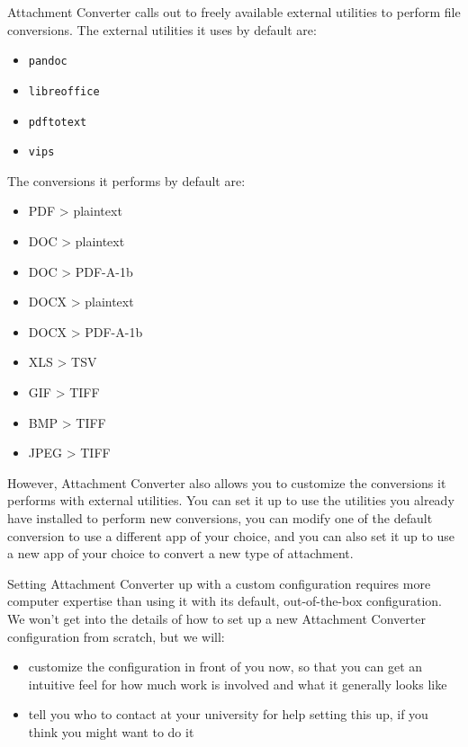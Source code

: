 \documentclass[11pt]{article}
\begin{document}
Attachment Converter calls out to freely available external utilities
to perform file conversions.  The external utilities it uses by
default are:

\begin{itemize}
\item \texttt{pandoc}
\item \texttt{libreoffice}
\item \texttt{pdftotext}
\item \texttt{vips}
\end{itemize}

The conversions it performs by default are:

\begin{itemize}
\item PDF > plaintext
\item DOC > plaintext
\item DOC > PDF-A-1b
\item DOCX > plaintext
\item DOCX > PDF-A-1b
\item XLS > TSV
\item GIF > TIFF
\item BMP > TIFF
\item JPEG > TIFF
\end{itemize}

However, Attachment Converter also allows you to customize the
conversions it performs with external utilities.  You can set it up to
use the utilities you already have installed to perform new
conversions, you can modify one of the default conversion to use a
different app of your choice, and you can also set it up to use a new
app of your choice to convert a new type of attachment.

Setting Attachment Converter up with a custom configuration requires
more computer expertise than using it with its default, out-of-the-box
configuration.  We won't get into the details of how to set up a new
Attachment Converter configuration from scratch, but we will:

\begin{itemize}
\item customize the configuration in front of you now, so that you can get
an intuitive feel for how much work is involved and what it
generally looks like
\item tell you who to contact at your university for help setting this up,
if you think you might want to do it
\end{itemize}
\end{document}
